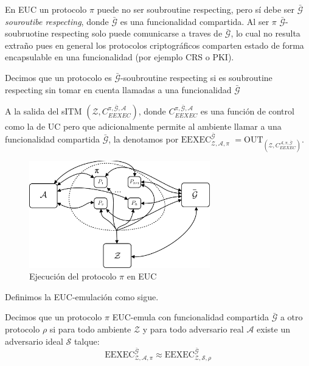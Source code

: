 En EUC un protocolo $\pi$ puede no ser soubroutine respecting, pero sí debe ser
$\bar{\mathcal{G}}$\textit{souroutibe respecting}, donde $\bar{\mathcal{G}}$ es una funcionalidad compartida.
Al ser $\pi$ $\bar{\mathcal{G}}$-soubruotine respecting solo puede comunicarse a traves de $\bar{\mathcal{G}}$,
lo cual no resulta extraño pues en general los protocolos criptográficos comparten estado de forma encapsulable
en una funcionalidad (por ejemplo CRS o PKI).

\begin{definicion}
Decimos que un protocolo es $\bar{\mathcal{G}}$-soubroutine respecting si es soubroutine respecting sin
tomar en cuenta llamadas a una funcionalidad $\bar{\mathcal{G}}$
\end{definicion}

A la salida del sITM $(\mathcal{Z}, C_{EEXEC}^{\pi, \bar{\mathcal{G}}, \mathcal{A}})$, donde
$C_{EEXEC}^{\pi, \bar{\mathcal{G}}, \mathcal{A}}$ es una función de control
como la de UC pero que adicionalmente permite al ambiente llamar a una funcionalidad compartida
$\bar{\mathcal{G}}$, la denotamos por $\mathrm{EEXEC}_{\mathcal{Z}, \mathcal{A}, \mathcal{\pi}}^{\bar{\mathcal{G}}}$
$ = \mathrm{OUT}_{(\mathcal{Z}, C_{EEXEC}^{\mathcal{A}, \pi, \bar{\mathcal{G}}})}$.\\

\begin{figure}[hp]
    \centering
    \includegraphics[width=0.7\textwidth]{figs/mundo_real_euc}
    \caption{Ejecución del protocolo $\pi$ en EUC}
    \label{fig:mundo_real_euc}
\end{figure}

Definimos la EUC-emulación como sigue.

\begin{definicion}
Decimos que un protocolo $\pi$ EUC-emula con funcionalidad compartida $\bar{\mathcal{G}}$ a otro protocolo
$\rho$ si para todo ambiente $\mathcal{Z}$ y para todo adversario real $\mathcal{A}$ existe un adversario
ideal $\mathcal{S}$ talque:
$$\mathrm{EEXEC}_{\mathcal{Z}, \mathcal{A}, \mathcal{\pi}}^{\bar{\mathcal{G}}}
\approx
\mathrm{EEXEC}_{\mathcal{Z}, \mathcal{S}, \mathcal{\rho}}^{\bar{\mathcal{G}}}$$
\end{definicion}

